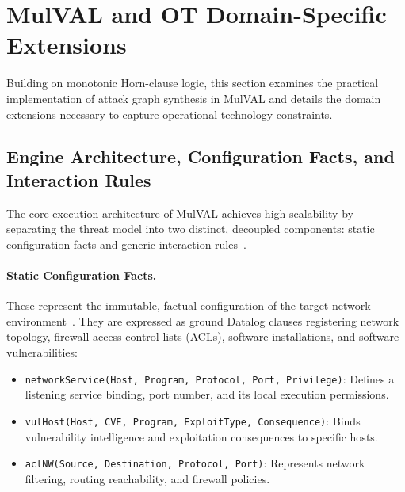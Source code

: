 \documentclass[target=mst,aauheader=aics,style=]{thud}
\begin{document}
\section{MulVAL and OT Domain-Specific Extensions}
\label{sec:mulval_domain_extensions}

Building on monotonic Horn-clause logic, this section examines the practical implementation of attack graph synthesis in MulVAL and details the domain extensions necessary to capture operational technology constraints.

\subsection{Engine Architecture, Configuration Facts, and Interaction Rules}
\label{sec:mulval_arch_components}
The core execution architecture of MulVAL achieves high scalability by separating the threat model into two distinct, decoupled components: static configuration facts and generic interaction rules~\cite{Ou05}.

\paragraph{Static Configuration Facts.} These represent the immutable, factual configuration of the target network environment~\cite{Ou05}. They are expressed as ground Datalog clauses registering network topology, firewall access control lists (ACLs), software installations, and software vulnerabilities:
\begin{itemize}
    \item \texttt{networkService(Host, Program, Protocol, Port, Privilege)}: Defines a listening service binding, port number, and its local execution permissions.
    \item \texttt{vulHost(Host, CVE, Program, ExploitType, Consequence)}: Binds vulnerability intelligence and exploitation consequences to specific hosts.
    \item \texttt{aclNW(Source, Destination, Protocol, Port)}: Represents network filtering, routing reachability, and firewall policies.
\end{itemize}
\end{document}
